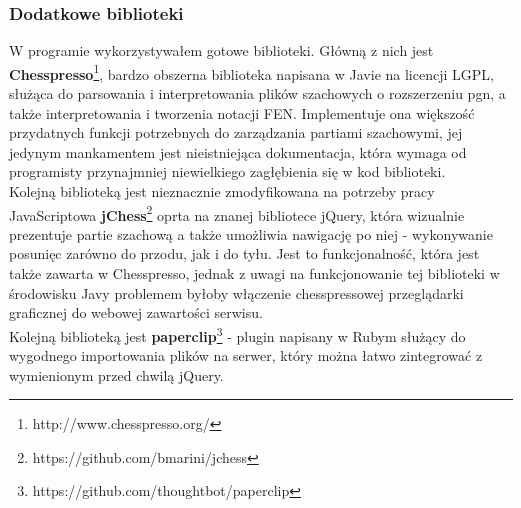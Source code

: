 \documentclass[12pt,leqno]{article}
\begin{document}
\subsubsection{Dodatkowe biblioteki}
W programie wykorzystywałem gotowe biblioteki. Główną z nich jest {\bf Chesspresso}\footnote{http://www.chesspresso.org/}, bardzo obszerna biblioteka napisana w Javie na licencji LGPL, służąca do parsowania i interpretowania plików szachowych o rozszerzeniu pgn, a także interpretowania i tworzenia notacji FEN. Implementuje ona większość przydatnych funkcji potrzebnych do zarządzania partiami szachowymi, jej jedynym mankamentem jest nieistniejąca dokumentacja, która wymaga od programisty przynajmniej niewielkiego zagłębienia się w kod biblioteki. \\
Kolejną biblioteką jest nieznacznie zmodyfikowana na potrzeby pracy JavaScriptowa {\bf jChess}\footnote{https://github.com/bmarini/jchess} oprta na znanej bibliotece jQuery, która wizualnie prezentuje partie szachową a także umożliwia nawigację po niej - wykonywanie posunięc zarówno do przodu, jak i do tyłu. Jest to funkcjonalność, która jest także zawarta w Chesspresso, jednak z uwagi na funkcjonowanie tej biblioteki w środowisku Javy problemem byłoby włączenie chesspressowej przeglądarki graficznej do webowej zawartości serwisu. \\ 
Kolejną biblioteką jest {\bf paperclip}\footnote{https://github.com/thoughtbot/paperclip} - plugin napisany w Rubym służący do wygodnego importowania plików na serwer, który można łatwo zintegrować z wymienionym przed chwilą jQuery.
\end{document}
